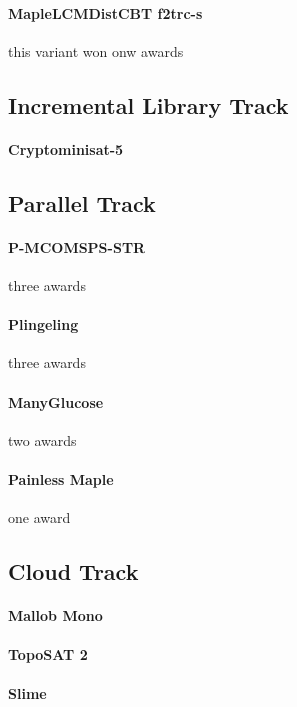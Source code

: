 \documentclass{elsarticle}
\begin{document}
\paragraph{MapleLCMDistCBT f2trc-s}
this variant won onw awards


\subsection{Incremental Library Track}
\paragraph{Cryptominisat-5}


\subsection{Parallel Track}

\paragraph{P-MCOMSPS-STR} three awards

\paragraph{Plingeling} three awards

\paragraph{ManyGlucose} two awards

\paragraph{Painless Maple} one award


\subsection{Cloud Track}

\paragraph{Mallob Mono}

\paragraph{TopoSAT 2}

\paragraph{Slime}
\end{document}
